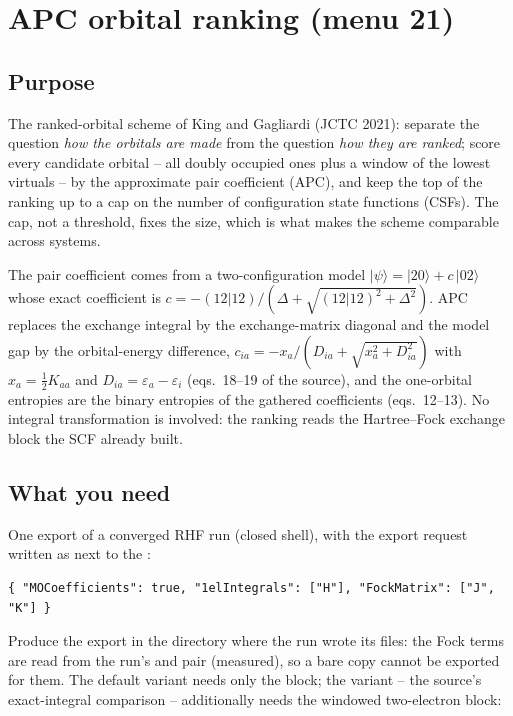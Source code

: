 \chapter{APC orbital ranking (menu 21)}
\label{ch:menu21}

\section{Purpose}

The ranked-orbital scheme of King and Gagliardi (JCTC 2021): separate the
question \emph{how the orbitals are made} from the question \emph{how they are
ranked}; score every candidate orbital -- all doubly occupied ones plus a
window of the lowest virtuals -- by the approximate pair coefficient (APC),
and keep the top of the ranking up to a cap on the number of configuration
state functions (CSFs).  The cap, not a threshold, fixes the size, which is
what makes the scheme comparable across systems.

The pair coefficient comes from a two-configuration model
$|\psi\rangle = |20\rangle + c\,|02\rangle$ whose exact coefficient is
$c = -(12|12)/(\Delta + \sqrt{(12|12)^2 + \Delta^2})$.  APC replaces the
exchange integral by the exchange-matrix diagonal and the model gap by the
orbital-energy difference,
$c_{ia} = -x_a/(D_{ia} + \sqrt{x_a^2 + D_{ia}^2})$ with $x_a = \tfrac12 K_{aa}$
and $D_{ia} = \varepsilon_a - \varepsilon_i$ (eqs.~18--19 of the source), and
the one-orbital entropies are the binary entropies of the gathered
coefficients (eqs.~12--13).  No integral transformation is involved: the
ranking reads the Hartree--Fock exchange block the SCF already built.

\section{What you need}

One  export of a converged RHF run (closed shell), with the
export request written as  next to the :

\begin{lstlisting}[style=fbkcode]
{ "MOCoefficients": true, "1elIntegrals": ["H"], "FockMatrix": ["J", "K"] }
\end{lstlisting}

Produce the export in the directory where the run wrote its files: the Fock
terms are read from the run's  and
 pair (measured), so a bare  copy cannot
be exported for them.  The default  variant needs only the 
block; the  variant -- the source's exact-integral comparison --
additionally needs the windowed two-electron block:

